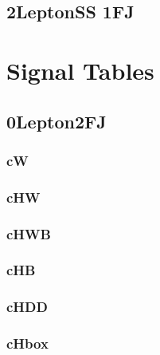 \documentclass[landscape, 12pt,letterpaper]{article}
\begin{document}
\subsection{2LeptonSS 1FJ}


\newpage



\section{Signal Tables}
\subsection{0Lepton2FJ }
\subsubsection{cW}


\newpage

\subsubsection{cHW}


\newpage

\subsubsection{cHWB}


\newpage

\subsubsection{cHB}


\newpage

\subsubsection{cHDD}


\newpage

\subsubsection{cHbox}

\end{document}
